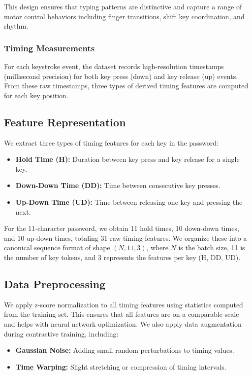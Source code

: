 \documentclass{ieeeaccess}
\begin{document}
{This design ensures that typing patterns are distinctive and capture a range of motor control behaviors including finger transitions, shift key coordination, and rhythm.

\subsubsection{Timing Measurements}
For each keystroke event, the dataset records high-resolution timestamps (millisecond precision) for both key press (down) and key release (up) events. From these raw timestamps, three types of derived timing features are computed for each key position.

\subsection{Feature Representation}
We extract three types of timing features for each key in the password:

\begin{itemize}
\item \textbf{Hold Time (H):} Duration between key press and key release for a single key.
\item \textbf{Down-Down Time (DD):} Time between consecutive key presses.
\item \textbf{Up-Down Time (UD):} Time between releasing one key and pressing the next.
\end{itemize}

For the 11-character password, we obtain 11 hold times, 10 down-down times, and 10 up-down times, totaling 31 raw timing features. We organize these into a canonical sequence format of shape $(N, 11, 3)$, where $N$ is the batch size, 11 is the number of key tokens, and 3 represents the features per key (H, DD, UD).

\subsection{Data Preprocessing}
We apply z-score normalization to all timing features using statistics computed from the training set. This ensures that all features are on a comparable scale and helps with neural network optimization. We also apply data augmentation during contrastive training, including:

\begin{itemize}
\item \textbf{Gaussian Noise:} Adding small random perturbations to timing values.
\item \textbf{Time Warping:} Slight stretching or compression of timing intervals.
\end{itemize}

}
\end{document}
